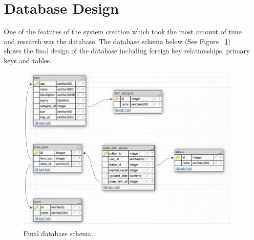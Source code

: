 \documentclass[a4paper,11pt]{report}
\begin{document}
\section{Database Design}
One of the features of the system creation which took the most amount of time and research was the database.
The database schema below (See Figure ~\ref{fig:DBSchema}) shows the final design of the database including foreign key relationships, primary keys and tables.

\begin{figure}[H]
    \centering
    \includegraphics[width=12.5cm]{./assets/images/Database-Schema.png}
    \caption{Final database schema.}
    \label{fig:DBSchema}
\end{figure}
\end{document}
